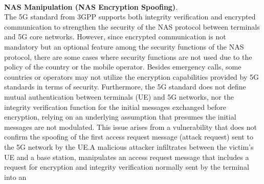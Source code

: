 \documentclass[english]{article}
\begin{document}
\\
\textbf{NAS Manipulation (NAS Encryption Spoofing)}. \\
The 5G standard from 3GPP supports both integrity verification and encrypted
communication to strengthen the security of the NAS protocol between terminals
and 5G core networks. However, since encrypted communication is not mandatory
but an optional feature among the security functions of the NAS protocol,
there are some cases where security functions are not used due to the policy
of the country or the mobile operator. Besides emergency calls, some countries
or operators may not utilize the encryption capabilities provided by 5G
standards in terms of security. Furthermore, the 5G standard does not define
mutual authentication between terminals (UE) and 5G networks, nor the integrity
verification function for the initial messages exchanged before encryption,
relying on an underlying assumption that presumes the initial messages are not
modulated. This issue arises from a vulnerability that does not confirm the
spoofing of the first access request message (attack request) sent to the 5G
network by the UE.\@ A malicious attacker infiltrates between the victim's UE
and a base station, manipulates an access request message that includes a request
for encryption and integrity verification normally sent by the terminal into an
\end{document}
